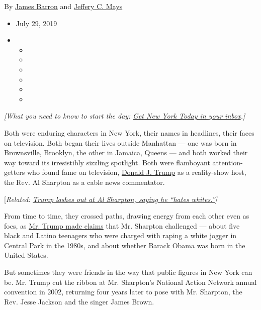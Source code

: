 By \href{https://www.nytimes.com/by/james-barron}{James Barron} and
\href{https://www.nytimes.com/by/jeffery-c-mays}{Jeffery C. Mays}

\begin{itemize}
\item
  July 29, 2019
\item
  \begin{itemize}
  \item
  \item
  \item
  \item
  \item
  \item
  \end{itemize}
\end{itemize}

\emph{{[}What you need to know to start the day:}
\href{https://www.nytimes.com/newsletters/newyorktoday?module=inline}{\emph{Get
New York Today in your inbox}}\emph{.{]}}

Both were enduring characters in New York, their names in headlines,
their faces on television. Both began their lives outside Manhattan ---
one was born in Brownsville, Brooklyn, the other in Jamaica, Queens ---
and both worked their way toward its irresistibly sizzling spotlight.
Both were flamboyant attention-getters who found fame on television,
\href{https://www.nytimes.com/2019/07/29/nyregion/trump-sharpton-ny-history.html}{Donald
J. Trump} as a reality-show host, the Rev. Al Sharpton as a cable news
commentator.

{[}\emph{Related:}
\href{https://www.nytimes.com/2019/07/29/us/politics/trump-al-sharpton.html}{\emph{Trump
lashes out at Al Sharpton, saying he ``hates whites.''}}\emph{{]}}

From time to time, they crossed paths, drawing energy from each other
even as foes, as
\href{https://www.nytimes.com/2002/10/23/nyregion/trump-draws-criticism-for-ad-he-ran-after-jogger-attack.html}{Mr.
Trump made claims} that Mr. Sharpton challenged --- about five black and
Latino teenagers who were charged with raping a white jogger in Central
Park in the 1980s, and about whether Barack Obama was born in the United
States.

But sometimes they were friends in the way that public figures in New
York can be. Mr. Trump cut the ribbon at Mr. Sharpton's National Action
Network annual convention in 2002, returning four years later to pose
with Mr. Sharpton, the Rev. Jesse Jackson and the singer James Brown.

